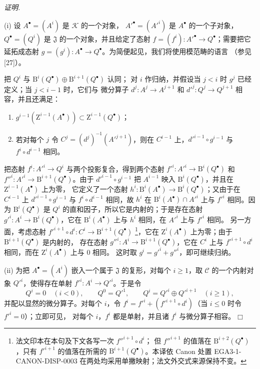 \documentclass[UTF8,fontset=none,11pt,oneside,openany]{ctexbook}
\providecommand{\square}{\mdlgwhtsquare}
\newcommand{\SourceCorrectionNote}[1]{\footnote{#1}}
\newenvironment{proof}{%
  \par\smallskip\noindent\textit{证明.}\ %
}{\hfill$\square$\par}
\begin{document}
\begin{proof}
\textup{(i)} 设 $A^\bullet=(A^i)$ 是 $\mathcal K$ 的一个对象，
$A'^\bullet=(A'^i)$ 是 $A^\bullet$ 的一个子对象，
$Q^\bullet=(Q^i)$ 是 $\mathfrak J$ 的一个对象，并且给定了态射
$f=(f^i):A'^\bullet\to Q^\bullet$；需要把它延拓成态射
$g=(g^i):A^\bullet\to Q^\bullet$。为简便起见，我们将使用模范畴的语言
（参见 [27]）。

把 $Q^i$ 与 $\mathrm B^i(Q^\bullet)\oplus\mathrm B^{i+1}(Q^\bullet)$ 认同；
对 $i$ 作归纳，并假设当 $j<i$ 时 $g^j$ 已经定义；当 $j<i-1$ 时，它们与
微分算子 $d^j:A^j\to A^{j+1}$ 和 $d'^j:Q^j\to Q^{j+1}$ 相容，并且还满足：
\begin{enumerate}
  \item[$1^\circ$] $g^{i-1}(\mathrm Z^{i-1}(A^\bullet))\subset
    \mathrm Z^{i-1}(Q^\bullet)$；
  \item[$2^\circ$] 若对每个 $j$ 令 $C^j=(d^j)^{-1}(A'^{j+1})$，则在
    $C^{i-1}$ 上，$d'^{i-1}\circ g^{i-1}$ 与
    $f^i\circ d^{i-1}$ 相同。
\end{enumerate}
把态射 $f^i:A'^i\to Q^i$ 与两个投影复合，得到两个态射
$f'^i:A'^i\to\mathrm B^i(Q^\bullet)$ 和
$f''^i:A'^i\to\mathrm B^{i+1}(Q^\bullet)$。由于
$d'^{i-1}\circ g^{i-1}$ 把 $A^{i-1}$ 映入
$\mathrm B^i(Q^\bullet)$，并且在 $\mathrm Z^{i-1}(A^\bullet)$ 上为零，
它定义了一个态射
$h^i:\mathrm B^i(A^\bullet)\to\mathrm B^i(Q^\bullet)$；又由于在
$C^{i-1}$ 上 $d'^{i-1}\circ g^{i-1}$ 与
$f^i\circ d^{i-1}$ 相同，故 $h^i$ 在
$\mathrm B^i(A^\bullet)\cap A'^i$ 上与 $f'^i$ 相同。因为
$\mathrm B^i(Q^\bullet)$ 是 $Q^i$ 的直和因子，所以它是内射的；于是存在态射
$g'^i:A^i\to\mathrm B^i(Q^\bullet)$，它在
$\mathrm B^i(A^\bullet)$ 上与 $h^i$ 相同，在 $A'^i$ 上与 $f'^i$ 相同。
另一方面，考虑态射
$f'^{i+1}\circ d^i:C^i\to\mathrm B^{i+1}(Q^\bullet)$
\SourceCorrectionNote{法文印本在本句及下文各写一次 $f''^{i+1}\circ d^i$；
但 $f''^{i+1}$ 的值落在 $\mathrm B^{i+2}(Q^\bullet)$，只有
$f'^{i+1}$ 的值落在所需的 $\mathrm B^{i+1}(Q^\bullet)$。本译依 Canon 处置
EGA3-1-CANON-DISP-0003 在两处均采用单撇映射；法文外交式来源保持不变。}，它在
$\mathrm Z^i(A^\bullet)$ 上为零；由于 $\mathrm B^{i+1}(Q^\bullet)$ 是内射的，
存在态射 $g''^i:A^i\to\mathrm B^{i+1}(Q^\bullet)$，它在 $C^i$ 上与
$f'^{i+1}\circ d^i$ 相同，而在 $\mathrm Z^i(A^\bullet)$ 上与 $0$ 相同。
这时取 $g^i=g'^i+g''^i$，即可继续归纳。

\textup{(ii)} 为把 $A^\bullet=(A^i)$ 嵌入一个属于 $\mathfrak J$ 的复形，对每个
$i\geq1$，取 $\mathcal C$ 的一个内射对象 $Q'^i$，使得存在单射
$f'^i:A^i\to Q'^i$。于是令
\[
  Q^i=0\quad(i<0),\qquad Q^0=Q'^1,\qquad
  Q^i=Q'^i\oplus Q'^{i+1}\quad(i\geq1),
\]
并配以显然的微分算子。对每个 $i$，令
$f^i=f'^i+(f'^{i+1}\circ d^i)$（当 $i\leq0$ 时令 $f'^i=0$）；立即可见，
对每个 $i$，$f^i$ 都是单射，并且诸 $f^i$ 与微分算子相容。
\end{proof}
\end{document}
